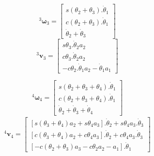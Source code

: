 \begin{multicols}{2}
    \noindent
    \begin{equation}
        ^3\boldsymbol{\omega}_3 = \begin{bmatrix}
                        s(\theta_2+\theta_3).\dot{\theta}_1 \\
                        c(\theta_2+\theta_3).\dot{\theta}_1 \\ 
                        \dot{\theta}_2 + \dot{\theta}_3
                    \end{bmatrix}
    \end{equation}
    \begin{equation}
        ^3\textbf{v}_3 = \begin{bmatrix}
                    s\theta_3.\dot{\theta}_2a_2 \\ 
                    c\theta_3.\dot{\theta}_2a_2\\ 
                    -c\theta_2.\dot{\theta}_1a_2 - \dot{\theta}_1a_1
                \end{bmatrix}
    \end{equation}
\end{multicols}

\begin{multicols}{2}
    \noindent
    \begin{equation}
        ^4\boldsymbol{\omega}_4 = \begin{bmatrix}
                        s(\theta_2+\theta_3+\theta_4).\dot{\theta}_1 \\
                        c(\theta_2+\theta_3+\theta_4).\dot{\theta}_1 \\ 
                        \dot{\theta}_2 + \dot{\theta}_3 + \dot{\theta}_4
                    \end{bmatrix}
    \end{equation}
    \begin{equation}
        \begin{split}
            ^4\textbf{v}_4 = \begin{bmatrix}
                    [s(\theta_3+\theta_4)a_2 + s\theta_4a_3].\dot{\theta}_2 + s\theta_4a_3.\dot{\theta}_3 \\ 
                    [c(\theta_3+\theta_4)a_2 + c\theta_4a_3].\dot{\theta}_2 + c\theta_4a_3.\dot{\theta}_3 \\ 
                    [-c(\theta_2 + \theta_3)a_3 - c\theta_2a_2 - a_1].\dot{\theta}_1
                \end{bmatrix}
        \end{split}
    \end{equation}
\end{multicols}

